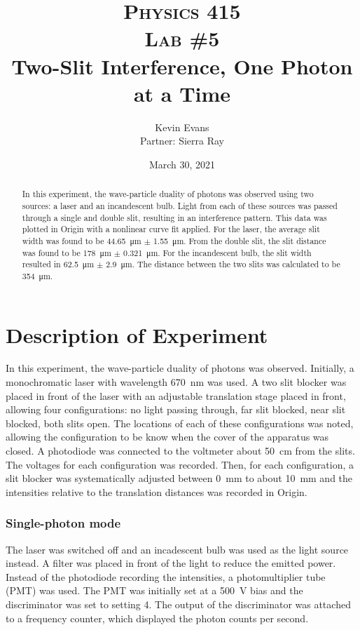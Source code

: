 \documentclass[notitlepage]{report}
\title{
	\textsc{ \small
		Physics 415
	} \\
	{\textsc{\small Lab \#5}} \\
	Two-Slit Interference, One Photon at a Time
}
\author{Kevin Evans \\ Partner: Sierra Ray}
\date{March 30, 2021}
\begin{document}
	\begin{titlingpage}
		\maketitle
		\begin{abstract}
			\noindent In this experiment, the wave-particle duality of photons was observed using two sources: a laser and an incandescent bulb. Light from each of these sources was passed through a single and double slit, resulting in an interference pattern. This data was plotted in Origin with a nonlinear curve fit applied. 
			For the laser, the average slit width was found to be \SI{44.65}{\um} $\pm$ \SI{1.55}{\um}. From the double slit, the slit distance was found to be \SI{178}{\um} $\pm$ \SI{0.321}{\um}. For the incandescent bulb, the slit width resulted in \SI{62.5}{\um} $\pm$ \SI{2.9}{\um}. The distance between the two slits was calculated to be \SI{354}{\um}.
		\end{abstract}
	\end{titlingpage}
	
	\section{Description of Experiment}
	In this experiment, the wave-particle duality of photons was observed. Initially, a monochromatic laser with wavelength \SI{670}{\nm} was used. A two slit blocker was placed in front of the laser with an adjustable translation stage placed in front, allowing four configurations: no light passing through, far slit blocked, near slit blocked, both slits open. The locations of each of these configurations was noted, allowing the configuration to be know when the cover of the apparatus was closed. A photodiode was connected to the voltmeter about \SI{50}{\centi\meter} from the slits. The voltages for each configuration was recorded. Then, for each configuration, a slit blocker was systematically adjusted between \SI{0}{\mm} to about \SI{10}{\mm} and the intensities relative to the translation distances was recorded in Origin.
	
	\subsubsection{Single-photon mode}
	The laser was switched off and an incadescent bulb was used as the light source instead. A filter was placed in front of the light to reduce the emitted power. Instead of the photodiode recording the intensities, a photomultiplier tube (PMT) was used. The PMT was initially set at a \SI{500}{\V} bias and the discriminator was set to setting 4. The output of the discriminator was attached to a frequency counter, which displayed the photon counts per second.
	
\end{document}
